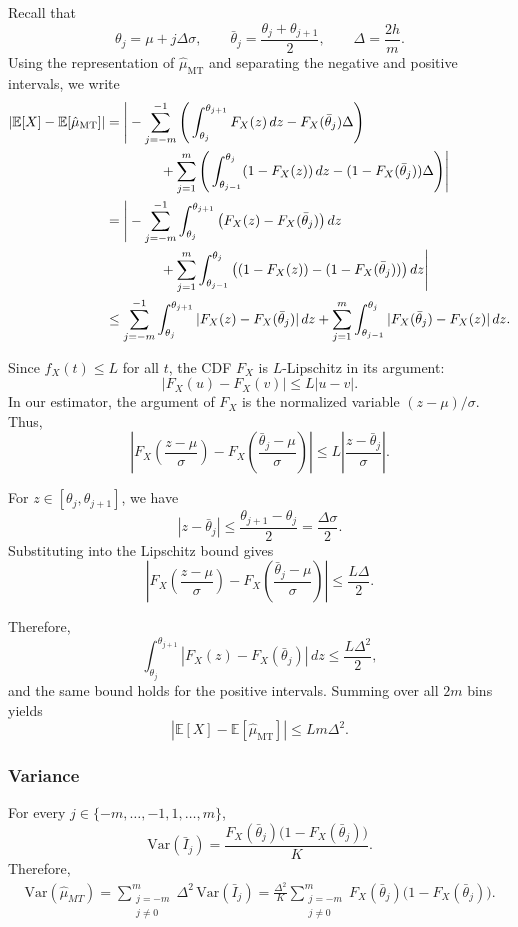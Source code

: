 \documentclass[10pt]{article} %
\theoremstyle{plain}
\theoremstyle{definition}
\theoremstyle{remark}
\newcommand{\bE}{\mathbb E}
\newcommand{\rvar}{\mathrm{Var}}
\begin{document}
Recall that
\[
\theta_j = \mu + j\Delta\sigma,
\qquad
\bar{\theta}_j = \frac{\theta_j + \theta_{j+1}}{2},
\qquad
\Delta = \frac{2h}{m}.
\]
Using the representation of $\hat{\mu}_{\text{MT}}$ and separating the negative
and positive intervals, we write
\begin{align}
|\bE[X] - \bE[\hat{\mu}_{\text{MT}}]|
&= \Bigg| -\sum_{j=-m}^{-1} \Bigg(\int_{\theta_j}^{\theta_{j+1}} F_{X}(z)\,dz
- F_{X}(\bar{\theta}_j)\Delta\Bigg) \notag\\
&\qquad\qquad+ \sum_{j=1}^{m} \Bigg(\int_{\theta_{j-1}}^{\theta_j} (1-F_{X}(z))\,dz
- (1-F_{X}(\bar{\theta}_j))\Delta\Bigg)\Bigg| \notag\\
&= \Bigg| -\sum_{j=-m}^{-1} \int_{\theta_j}^{\theta_{j+1}} \left( F_{X}(z)
- F_{X}(\bar{\theta}_j) \right) dz  \notag\\
&\qquad\qquad + \sum_{j=1}^{m}\int_{\theta_{j-1}}^{\theta_j} \left( (1-F_{X}(z))
- (1-F_{X}(\bar{\theta}_j)) \right) dz \Bigg| \\
&\leq \sum_{j=-m}^{-1} \int_{\theta_j}^{\theta_{j+1}} |F_{X}(z)
- F_{X}(\bar{\theta}_j)|\,dz 
+ \sum_{j=1}^{m}\int_{\theta_{j-1}}^{\theta_j} |F_{X}(\bar{\theta}_j) - F_{X}(z)|\,dz.
\end{align}

Since $f_X(t)\le L$ for all $t$, the CDF $F_X$ is $L$-Lipschitz in its
argument:
\[
|F_X(u)-F_X(v)| \le L|u-v|.
\]
In our estimator, the argument of $F_X$ is the normalized variable
\(
(z-\mu)/\sigma.
\)
Thus,
\[
\left|
F_X\!\left(\frac{z-\mu}{\sigma}\right)
-
F_X\!\left(\frac{\bar{\theta}_j-\mu}{\sigma}\right)
\right|
\le
L\left|\frac{z-\bar{\theta}_j}{\sigma}\right|.
\]

For $z\in[\theta_j,\theta_{j+1}]$, we have
\[
|z - \bar{\theta}_j|
\le
\frac{\theta_{j+1}-\theta_j}{2}
=
\frac{\Delta\sigma}{2}.
\]
Substituting into the Lipschitz bound gives
\[
\left|
F_X\!\left(\frac{z-\mu}{\sigma}\right)
-
F_X\!\left(\frac{\bar{\theta}_j-\mu}{\sigma}\right)
\right|
\le
\frac{L\Delta}{2}.
\]

Therefore,
\[
\int_{\theta_j}^{\theta_{j+1}}
|F_X(z)-F_X(\bar{\theta}_j)|\,dz
\le
\frac{L\Delta^2}{2},
\]
and the same bound holds for the positive intervals. Summing over
all $2m$ bins yields
\[
|\bE[X] - \bE[\hat{\mu}_{\text{MT}}]|
\le
Lm\Delta^2.
\]


\subsubsection{Variance}

For every $j\in\{-m,\ldots,-1,1,\ldots,m\}$,
\[
\rvar(\bar{I}_j)
=
\frac{F_{X}(\bar{\theta}_j)\bigl(1-F_{X}(\bar{\theta}_j)\bigr)}{K}.
\]
Therefore,
\begin{align}
\rvar(\hat{\mu}_{MT})
 = \sum_{\substack{j=-m \\ j\neq 0}}^{m}
\Delta^2\,\rvar(\bar{I}_j) =
\frac{\Delta^2}{K}
\sum_{\substack{j=-m \\ j\neq 0}}^{m}
F_{X}(\bar{\theta}_j)\bigl(1-F_{X}(\bar{\theta}_j)\bigr).
\end{align}
\end{document}
